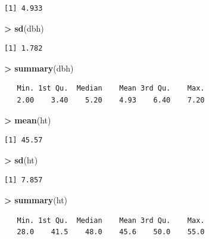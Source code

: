 \documentclass[]{krantz}
\makeatletter
\newenvironment{Shaded}{\begin{snugshade}}{\end{snugshade}}
\newcommand{\KeywordTok}[1]{\textcolor[rgb]{0.27,0.27,0.27}{\textbf{#1}}}
\newcommand{\StringTok}[1]{\textcolor[rgb]{0.5,0.5,0.5}{#1}}
\newcommand{\OperatorTok}[1]{\textcolor[rgb]{0.43,0.43,0.43}{\textbf{#1}}}
\newcommand{\NormalTok}[1]{#1}
\newenvironment{kframe}{%
\medskip{}
\setlength{\fboxsep}{.8em}
 \def\at@end@of@kframe{}%
 \ifinner\ifhmode%
  \def\at@end@of@kframe{\end{minipage}}%
  \begin{minipage}{\columnwidth}%
 \fi\fi%
 \def\FrameCommand##1{\hskip\@totalleftmargin \hskip-\fboxsep
 \colorbox{shadecolor}{##1}\hskip-\fboxsep
     \hskip-\linewidth \hskip-\@totalleftmargin \hskip\columnwidth}%
 \MakeFramed {\advance\hsize-\width
   \@totalleftmargin\z@ \linewidth\hsize
   \@setminipage}}%
 {\par\unskip\endMakeFramed%
 \at@end@of@kframe}
\renewenvironment{Shaded}{\begin{kframe}}{\end{kframe}}
\theoremstyle{definition}
\theoremstyle{definition}
\theoremstyle{definition}
\theoremstyle{remark}
\makeatother
\begin{document}
\begin{verbatim}
[1] 4.933
\end{verbatim}

\begin{Shaded}
\begin{Highlighting}[]
\OperatorTok{>}\StringTok{ }\KeywordTok{sd}\NormalTok{(dbh)}
\end{Highlighting}
\end{Shaded}

\begin{verbatim}
[1] 1.782
\end{verbatim}

\begin{Shaded}
\begin{Highlighting}[]
\OperatorTok{>}\StringTok{ }\KeywordTok{summary}\NormalTok{(dbh)}
\end{Highlighting}
\end{Shaded}

\begin{verbatim}
   Min. 1st Qu.  Median    Mean 3rd Qu.    Max. 
   2.00    3.40    5.20    4.93    6.40    7.20 
\end{verbatim}

\begin{Shaded}
\begin{Highlighting}[]
\OperatorTok{>}\StringTok{ }\KeywordTok{mean}\NormalTok{(ht)}
\end{Highlighting}
\end{Shaded}

\begin{verbatim}
[1] 45.57
\end{verbatim}

\begin{Shaded}
\begin{Highlighting}[]
\OperatorTok{>}\StringTok{ }\KeywordTok{sd}\NormalTok{(ht)}
\end{Highlighting}
\end{Shaded}

\begin{verbatim}
[1] 7.857
\end{verbatim}

\begin{Shaded}
\begin{Highlighting}[]
\OperatorTok{>}\StringTok{ }\KeywordTok{summary}\NormalTok{(ht)}
\end{Highlighting}
\end{Shaded}

\begin{verbatim}
   Min. 1st Qu.  Median    Mean 3rd Qu.    Max. 
   28.0    41.5    48.0    45.6    50.0    55.0 
\end{verbatim}
\end{document}
